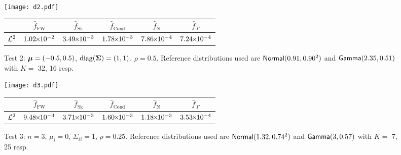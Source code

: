 \begin{figure}[H]
\centering
\texttt{[image: d2.pdf]}

\vspace{4mm}

\begin{tabular}{c|c|c|c|c|c|}
\cline{2-6}
                         & $\widehat{f}_{\mathrm{FW}}$  & $\widehat{f}_{\mathrm{Sk}}$ & $\widehat{f}_{\mathrm{Cond}}$ & $\widehat{f}_{\mathrm{N}}$  & $\widehat{f}_{\,\Gamma}$ \\ \hline
\multicolumn{1}{|c|}{$\mathcal{L}^2$} & $1.02 {\mkern-2mu\times\mkern-2mu} 10^{-2}$ & $3.49 {\mkern-2mu\times\mkern-2mu} 10^{-3}$ & $1.78 {\mkern-2mu\times\mkern-2mu} 10^{-3}$ & $7.86 {\mkern-2mu\times\mkern-2mu} 10^{-4}$ & $7.24 {\mkern-2mu\times\mkern-2mu} 10^{-4}$ \\ \hline
\end{tabular}
\caption*{Test 2: $\bm{\mu} = (-0.5, 0.5)$, $\mathrm{diag}(\bm{\Sigma})= (1,1)$, $\rho = 0.5$. Reference distributions used are $\mathsf{Normal}(0.91,0.90^2)$ and $\mathsf{Gamma}(2.35,0.51)$ with $K =$ 32, 16 resp.}
\end{figure}



\begin{figure}[H]
\centering
\texttt{[image: d3.pdf]}

\vspace{4mm}

\begin{tabular}{c|c|c|c|c|c|}
\cline{2-6}
                         & $\widehat{f}_{\mathrm{FW}}$  & $\widehat{f}_{\mathrm{Sk}}$ & $\widehat{f}_{\mathrm{Cond}}$ & $\widehat{f}_{\mathrm{N}}$  & $\widehat{f}_{\,\Gamma}$ \\ \hline
\multicolumn{1}{|c|}{$\mathcal{L}^2$} & $9.48 {\mkern-2mu\times\mkern-2mu} 10^{-3}$ & $3.71 {\mkern-2mu\times\mkern-2mu} 10^{-3}$ & $1.60 {\mkern-2mu\times\mkern-2mu} 10^{-3}$ & $1.18 {\mkern-2mu\times\mkern-2mu} 10^{-3}$ & $3.53 {\mkern-2mu\times\mkern-2mu} 10^{-4}$ \\ \hline
\end{tabular}
\caption*{Test 3: $n=3$, $\mu_i = 0$, $\Sigma_{ii} = 1$, $\rho = 0.25$. Reference distributions used are $\mathsf{Normal}(1.32,0.74^2)$ and $\mathsf{Gamma}(3,0.57)$ with $K =$ 7, 25 resp.}
\end{figure}



